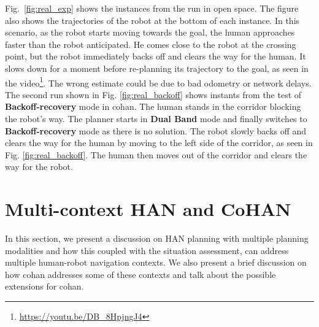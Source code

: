 Fig.~\ref{fig:real_exp} shows the instances from the run in open space. The figure also shows the trajectories of the robot at the bottom of each instance. In this scenario, as the robot starts moving towards the goal, the human approaches faster than the robot anticipated. He comes close to the robot at the crossing point, but the robot immediately backs off and clears the way for the human. It slows down for a moment before re-planning its trajectory to the goal, as seen in the video\footnote{\url{https://youtu.be/DB_8HpjngJ4}}. The wrong estimate could be due to bad odometry or network delays. The second run shown in Fig. \ref{fig:real_backoff} shows instants from the test of \textbf{Backoff-recovery} mode in \acrshort{cohan}. The human stands in the corridor blocking the robot's way. The planner starts in \textbf{Dual Band} mode and finally switches to \textbf{Backoff-recovery} mode as there is no solution. The robot slowly backs off and clears the way for the human by moving to the left side of the corridor, as seen in Fig. \ref{fig:real_backoff}. The human then moves out of the corridor and clears the way for the robot.

\section{Multi-context HAN and CoHAN}\label{discussion_chap4}
In this section, we present a discussion on HAN planning with multiple planning modalities and how this coupled with the situation assessment, can address multiple human-robot navigation contexts. We also present a brief discussion on how \acrshort{cohan} addresses some of these contexts and talk about the possible extensions for \acrshort{cohan}.

